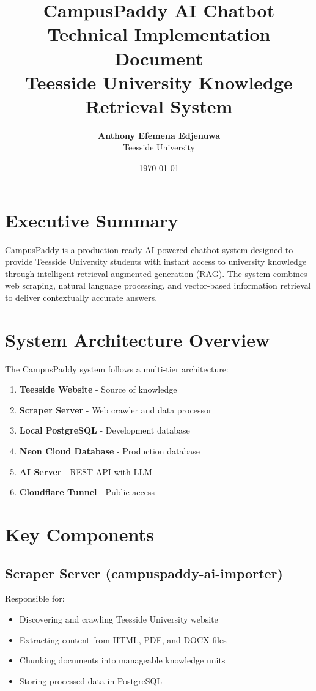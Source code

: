 \documentclass[12pt]{article}
\title{\textbf{CampusPaddy AI Chatbot}\\\textbf{Technical Implementation Document}\\[0.2cm]\large{Teesside University Knowledge Retrieval System}}
\author{\textbf{Anthony Efemena Edjenuwa}\\Teesside University}
\date{\today}
\begin{document}
\maketitle

\section*{Executive Summary}

CampusPaddy is a production-ready AI-powered chatbot system designed to provide Teesside University students with instant access to university knowledge through intelligent retrieval-augmented generation (RAG). The system combines web scraping, natural language processing, and vector-based information retrieval to deliver contextually accurate answers.

\section{System Architecture Overview}

The CampusPaddy system follows a multi-tier architecture:

\begin{enumerate}
    \item \textbf{Teesside Website} - Source of knowledge
    \item \textbf{Scraper Server} - Web crawler and data processor
    \item \textbf{Local PostgreSQL} - Development database
    \item \textbf{Neon Cloud Database} - Production database
    \item \textbf{AI Server} - REST API with LLM
    \item \textbf{Cloudflare Tunnel} - Public access
\end{enumerate}

\section{Key Components}

\subsection{Scraper Server (campuspaddy-ai-importer)}

Responsible for:
\begin{itemize}
    \item Discovering and crawling Teesside University website
    \item Extracting content from HTML, PDF, and DOCX files
    \item Chunking documents into manageable knowledge units
    \item Storing processed data in PostgreSQL
\end{itemize}
\end{document}
